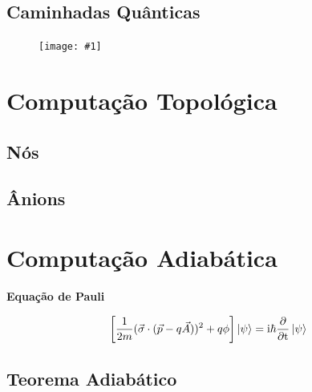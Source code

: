 \documentclass[t]{beamer}
\newcommand{\ii}{
	\rm{i}
}
\newcommand{\titulo}[1]{%
	\textbf{\Large #1\\}
}
\newcommand{\ket}[1]{\ensuremath{\left|#1\right\rangle}}
\newcommand{\imgw}[2]{%
\begin{center}
	\begin{figure}
	\texttt{[image: \#1]}\\
	\end{figure}
\end{center}
}
\begin{document}
	\subsection{Caminhadas Quânticas}
	
	\begin{frame}{\subsecname}
		\imgw{superposition.pdf}{\textwidth}
	\end{frame}

	\section{Computação Topológica}
	
	\subsection{Nós}
	
	\begin{frame}{\subsecname}
	
	\end{frame}	
	
	\begin{frame}{\subsecname}
	
	\end{frame}
	
	\subsection{Ânions}
	
	\begin{frame}{\subsecname}
	
	\end{frame}	
	
	\begin{frame}{\subsecname}
	
	\end{frame}
	
	\section{Computação Adiabática}
	
	\begin{frame}{\secname}
	\titulo{Equação de Pauli}
	$$\left[{\frac {1}{2m}}({\vec {\sigma }}\cdot ({\vec {p}}-q{\vec {A}}))^{2}+q\phi \right]\ket{\psi} = \ii\hbar {\frac {\partial }{\partial t}}\ket{\psi}$$
	
	\end{frame}
	
	\subsection{Teorema Adiabático}
	
\end{document}
